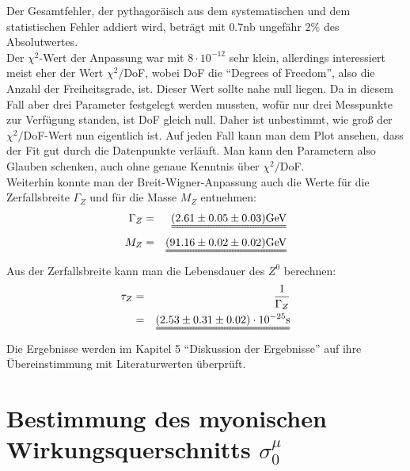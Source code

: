 Der Gesamtfehler, der pythagoräisch aus dem systematischen und dem statistischen Fehler addiert wird, beträgt mit $0.7\si{\nano\barn}$ ungefähr $2\%$ des Absolutwertes.\\
Der $\chi^2$-Wert der Anpassung war mit $8\cdot10^{-12}$ sehr klein, allerdings interessiert meist eher der Wert $\chi^2/$DoF, wobei DoF die ``Degrees of Freedom'', also die Anzahl der Freiheitsgrade, ist. Dieser Wert sollte nahe null liegen. Da in diesem Fall aber drei Parameter festgelegt werden mussten, wofür nur drei Messpunkte zur Verfügung standen, ist DoF gleich null. Daher ist unbestimmt, wie groß der $\chi^2/$DoF-Wert nun eigentlich ist. Auf jeden Fall kann man dem Plot  ansehen, dass der Fit gut durch die Datenpunkte verläuft. Man kann den Parametern also Glauben schenken, auch ohne genaue Kenntnis über $\chi^2/$DoF.\\
Weiterhin konnte man der Breit-Wigner-Anpassung auch die Werte für die Zerfallsbreite $\Gamma_Z$ und für die Masse $M_Z$ entnehmen:
\begin{eqnarray*}
\Gamma_Z &=& \uuline{(2.61 \pm 0.05 \pm 0.03)\si{\giga\electronvolt}}\\
M_Z &=& \uuline{(91.16 \pm 0.02 \pm 0.02)\si{\giga\electronvolt}}
\end{eqnarray*}
Aus der Zerfallsbreite kann man die Lebensdauer des $Z^0$ berechnen:
\begin{eqnarray}
\tau_Z &=& \frac{1}{\Gamma_Z}\\
\nonumber &=& \uuline{(2.53 \pm 0.31 \pm 0.02)\cdot 10^{-25}\si{\second}}
\end{eqnarray}
Die Ergebnisse werden im Kapitel 5 ``Diskussion der Ergebnisse'' auf ihre Übereinstimmung mit Literaturwerten überprüft.

\section{Bestimmung des myonischen Wirkungsquerschnitts $\sigma_0^{\mu}$}

